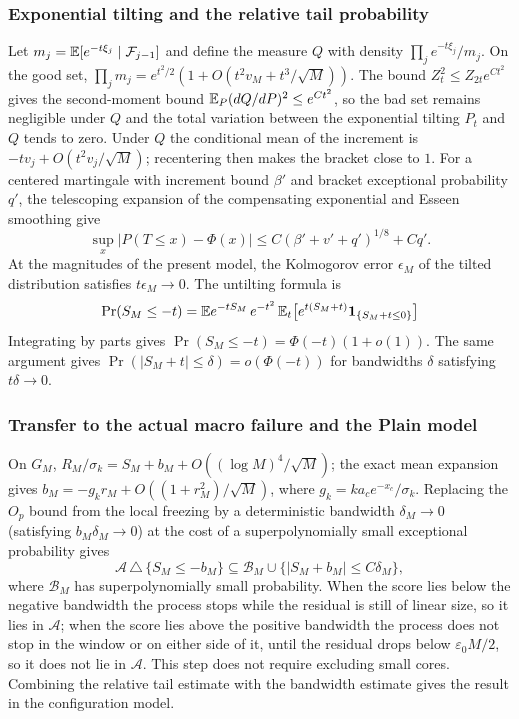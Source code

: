 \subsubsection{Exponential tilting and the relative tail probability}
Let $m_j=\mathbb E[e^{-t\xi_j}\mid\mathcal F_{j-1}]$ and define the measure $Q$ with density
$\prod_je^{-t\xi_j}/m_j$. On the good set,
$\prod_jm_j=e^{t^2/2}(1+O(t^2v_M+t^3/\sqrt M))$. The bound $Z_t^2\le Z_{2t}e^{Ct^2}$ gives the
second-moment bound $\mathbb E_P(dQ/dP)^2\le e^{Ct^2}$, so the bad set remains negligible under $Q$ and
the total variation between the exponential tilting $P_t$ and $Q$ tends to zero. Under $Q$ the
conditional mean of the increment is $-tv_j+O(t^2v_j/\sqrt M)$; recentering then makes the bracket
close to $1$. For a centered martingale with increment bound $\beta'$ and bracket exceptional
probability $q'$, the telescoping expansion of the compensating exponential and Esseen smoothing
give
\begin{equation*}
\sup_x|P(T\le x)-\Phi(x)|\le C(\beta'+v'+q')^{1/8}+Cq'.
\end{equation*}
At the magnitudes of the present model, the Kolmogorov error $\epsilon_M$ of the tilted
distribution satisfies $t\epsilon_M\to0$. The untilting formula is
\begin{equation*}
\Pr(S_M\le-t)=\mathbb E e^{-tS_M}\,e^{-t^2}\,\mathbb E_t\bigl[e^{t(S_M+t)}\mathbf1_{\{S_M+t\le0\}}\bigr]
\end{equation*}
Integrating by parts gives $\Pr(S_M\le-t)=\Phi(-t)(1+o(1))$. The same argument gives
$\Pr(|S_M+t|\le\delta)=o(\Phi(-t))$ for bandwidths $\delta$ satisfying $t\delta\to0$.

\subsubsection{Transfer to the actual macro failure and the Plain model}
On $G_M$, $R_M/\sigma_k=S_M+b_M+O((\log M)^4/\sqrt M)$; the exact mean expansion gives
$b_M=-g_kr_M+O((1+r_M^2)/\sqrt M)$, where $g_k=ka_ce^{-x_c}/\sigma_k$. Replacing the $O_p$ bound
from the local freezing by a deterministic bandwidth $\delta_M\to0$ (satisfying
$b_M\delta_M\to0$) at the cost of a superpolynomially small exceptional probability gives
\begin{equation*}
\mathcal A\,\triangle\,\{S_M\le-b_M\}\subseteq\mathcal B_M\cup\{|S_M+b_M|\le C\delta_M\},
\end{equation*}
where $\mathcal B_M$ has superpolynomially small probability. When the score lies below the
negative bandwidth the process stops while the residual is still of linear size, so it lies in
$\mathcal A$; when the score lies above the positive bandwidth the process does not stop in the
window or on either side of it, until the residual drops below $\varepsilon_0M/2$, so it does not
lie in $\mathcal A$. This step does not require excluding small cores. Combining the relative tail
estimate with the bandwidth estimate gives the result in the configuration model.

